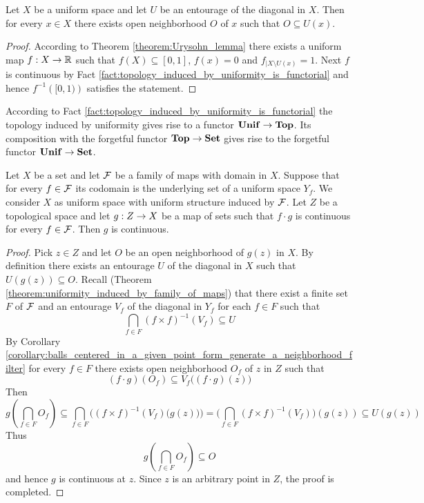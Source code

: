 \documentclass[10pt]{amsart}
\begin{document}
\begin{corollary}\label{corollary:balls_centered_in_a_given_point_form_generate_a_neighborhood_filter}
	Let $X$ be a uniform space and let $U$ be an entourage of the diagonal in $X$. Then for every $x \in X$ there exists open neighborhood $O$ of $x$ such that $O \subseteq U(x)$.
\end{corollary}
\begin{proof}
	According to Theorem \ref{theorem:Urysohn_lemma} there exists a uniform map $f:X\rightarrow {\mathbb R}$ such that $f(X) \subseteq [0,1]$, $f(x) = 0$ and $f_{\mid X\setminus U(x)} = 1$. Next $f$ is continuous by Fact \ref{fact:topology_induced_by_uniformity_is_functorial} and hence $f^{-1}\left([0,1)\right)$ satisfies the statement.
\end{proof}
\noindent
According to Fact \ref{fact:topology_induced_by_uniformity_is_functorial} the topology induced by uniformity gives rise to a functor $\mathbf{Unif} \rightarrow \mathbf{Top}$. Its composition with the forgetful functor $\mathbf{Top} \rightarrow \mathbf{Set}$ gives rise to the forgetful functor $\mathbf{Unif} \rightarrow \mathbf{Set}$.

\begin{theorem}\label{theorem:uniformity_induced_by_family_of_maps_induces_topology_induced_by_family}
	Let $X$ be a set and let ${\mathcal F}$ be a family of maps with domain in $X$. Suppose that for every $f\in {\mathcal F}$ its codomain is the underlying  set of a uniform space $Y_f$. We consider $X$ as uniform space with uniform structure induced by ${\mathcal F}$. Let $Z$ be a topological space and let $g:Z\rightarrow X$ be a map of sets such that $f \cdot g$ is continuous for every $f \in {\mathcal F}$. Then $g$ is continuous.
\end{theorem}
\begin{proof}
	Pick $z \in Z$ and let $O$ be an open neighborhood of $g(z)$ in $X$. By definition there exists an entourage $U$ of the diagonal in $X$ such that $U\left(g(z)\right) \subseteq O$. Recall (Theorem \ref{theorem:uniformity_induced_by_family_of_maps}) that there exist a finite set $F$ of ${\mathcal F}$ and an entourage $V_f$ of the diagonal in $Y_f$ for each $f\in F$ such that
	$$\bigcap_{f\in F}\left(f\times f\right)^{-1}(V_f) \subseteq U$$
	By Corollary \ref{corollary:balls_centered_in_a_given_point_form_generate_a_neighborhood_filter} for every $f \in F$ there exists open neighborhood $O_f$ of $z$ in $Z$ such that
	$$\left(f\cdot g\right)\left(O_f\right) \subseteq V_f\bigg(\left(f\cdot g\right)(z)\bigg)$$
	Then
	$$g\left(\bigcap_{f\in F}O_f\right) \subseteq \bigcap_{f\in F}\bigg(\left(f\times f\right)^{-1}(V_f)\big(g(z)\big)\bigg) = \bigg(\bigcap_{f\in F}\left(f\times f\right)^{-1}(V_f)\bigg)\left(g(z)\right) \subseteq U\left(g(z)\right)$$
	Thus
	$$g\left(\bigcap_{f\in F}O_f\right) \subseteq O$$
	and hence $g$ is continuous at $z$. Since $z$ is an arbitrary point in $Z$, the proof is completed.
\end{proof}
\end{document}
